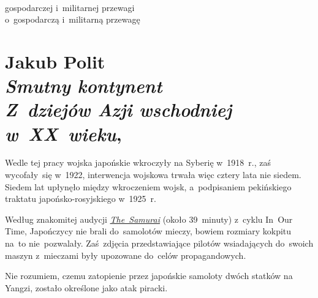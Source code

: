\documentclass[a4paper,11pt]{article}
\numberwithin{equation}{section}
\begin{document}
\VerSpaceTwo


\noindent
{} \\
\Jest gospodarczej i~militarnej przewagi \\
\PowinnoByc o~gospodarczą i~militarną przewagę \\










\newpage

\section{ %
  Jakub Polit \\
  \textit{Smutny kontynent} \\
  \textit{Z~dziejów Azji wschodniej w~XX~wieku},
  \cite{PolitSmutnyKontynent2002}}

\vspace{0em}



\vspace{0em}


\noindent
{} Wedle tej pracy wojska japońskie wkroczyły na Syberię
w~1918~r., zaś wycofały~się w~1922, interwencja wojskowa trwała więc
cztery lata nie siedem. Siedem lat upłynęło między wkroczeniem wojsk,
a~podpisaniem pekińskiego traktatu japońsko-rosyjskiego w~1925~r.

\VerSpaceFour





\noindent
{} Według znakomitej audycji
\href{https://www.bbc.co.uk/programmes/b00pcm9f}{\textit{The~Samurai}}
(około 39~minuty) z~cyklu In~Our Time, Japończycy nie brali
do~samolotów mieczy, bowiem rozmiary kokpitu na~to nie~pozwalały.
Zaś~zdjęcia przedstawiające pilotów wsiadających do~swoich maszyn
z~mieczami były upozowane do~celów propagandowych.

\VerSpaceFour





\noindent
{} Nie rozumiem, czemu zatopienie przez japońskie
samoloty dwóch statków na Yangzi, zostało określone jako atak piracki.

\VerSpaceFour
\end{document}
